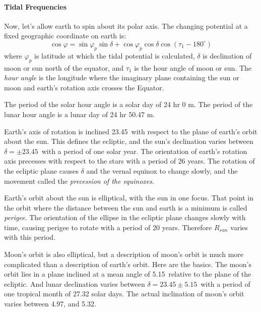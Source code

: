\paragraph{Tidal Frequencies}
 Now, let's allow earth to spin about its
polar axis. The changing potential at a fixed geographic coordinate on
earth is:
\begin{equation}
\cos \varphi = \sin \varphi _p \sin \delta + \cos \varphi _p \cos \delta \cos (\tau
_{1} - 180^{\circ})
\end{equation}
where $\varphi _p$ is latitude at which the tidal potential is
calculated, $\delta $ is declination of moon or sun north
of the equator, and $\tau _{1}$ is the hour angle of moon or sun. The
\textit{hour angle} 
 is the longitude where the
imaginary plane containing the sun or moon and earth's rotation axis
crosses the Equator.

The period of the solar hour angle is a solar day of 24 hr 0 m. The
period of the lunar hour angle is a lunar day of 24 hr 50.47 m.

Earth's axis of rotation is inclined 23.45\degrees\ with respect to
the plane of earth's orbit about the sun. This defines the ecliptic,
and the sun's declination varies between $\delta = \pm
23.45$\degrees\ with a period of one solar year. The orientation of
earth's rotation axis precesses with respect to the stars with a
period of 26 years. The rotation of the ecliptic plane
causes $\delta$ and the vernal equinox to change slowly, and the
movement called the \textit{precession of the equinoxes}.
  

Earth's orbit about the sun is elliptical, with the sun in one
focus. That point in the orbit where the distance between the sun and
earth is a minimum is called \textit{perigee}.    
 The orientation of the ellipse in the ecliptic
plane changes slowly with time, causing perigee to rotate with a
period of 20 years. Therefore $R_{sun}$ varies with this
period.

Moon's orbit is also elliptical, but a description of moon's orbit is
much more complicated than a description of earth's orbit. Here are
the basics. The moon's orbit lies in a plane inclined at a mean angle
of 5.15\degrees\ relative to the plane of the ecliptic. And lunar
declination varies between $\delta = 23.45 \pm 5.15$\degrees\ with a
period of one tropical month of 27.32 solar days. The actual
inclination of moon's orbit varies between 4.97\degrees, and
5.32\degrees.

